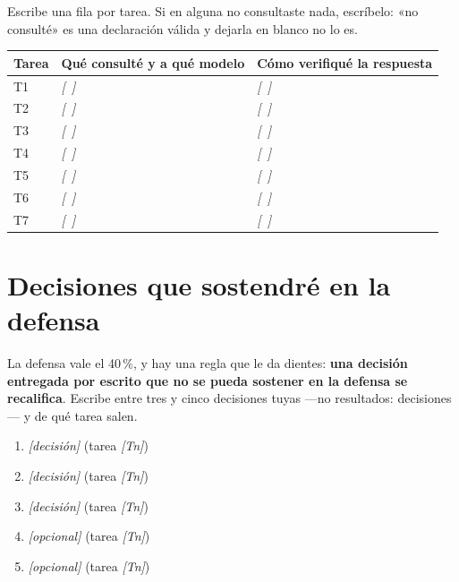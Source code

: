 \documentclass[11pt,a4paper,oneside]{article}
\newcommand{\marcador}[1]{\textcolor{grismarcador}{\textit{[#1]}}}
\begin{document}
Escribe una fila por tarea. Si en alguna no consultaste nada, escríbelo: «no consulté» es una
declaración válida y dejarla en blanco no lo es.

\vspace{0.3cm}
\renewcommand{\arraystretch}{1.4}
\begingroup\setlength{\parskip}{0pt}
\begin{tabularx}{\textwidth}{@{}l X X@{}}
\toprule
\textbf{Tarea} & \textbf{Qué consulté y a qué modelo} & \textbf{Cómo verifiqué la respuesta} \\
\midrule
T1 & \marcador{~} & \marcador{~} \\
T2 & \marcador{~} & \marcador{~} \\
T3 & \marcador{~} & \marcador{~} \\
T4 & \marcador{~} & \marcador{~} \\
T5 & \marcador{~} & \marcador{~} \\
T6 & \marcador{~} & \marcador{~} \\
T7 & \marcador{~} & \marcador{~} \\
\bottomrule
\end{tabularx}
\endgroup

\section{Decisiones que sostendré en la defensa}

La defensa vale el 40\,\%, y hay una regla que le da dientes: \textbf{una decisión entregada por
escrito que no se pueda sostener en la defensa se recalifica}. Escribe entre tres y cinco
decisiones tuyas —no resultados: decisiones— y de qué tarea salen.

\begin{enumerate}[leftmargin=*,itemsep=4pt]
  \item \marcador{decisión} \hfill \textcolor{grismarcador}{\small (tarea \marcador{Tn})}
  \item \marcador{decisión} \hfill \textcolor{grismarcador}{\small (tarea \marcador{Tn})}
  \item \marcador{decisión} \hfill \textcolor{grismarcador}{\small (tarea \marcador{Tn})}
  \item \marcador{opcional} \hfill \textcolor{grismarcador}{\small (tarea \marcador{Tn})}
  \item \marcador{opcional} \hfill \textcolor{grismarcador}{\small (tarea \marcador{Tn})}
\end{enumerate}
\end{document}
